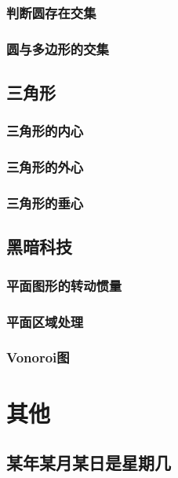 \documentclass[a4paper]{article}
\begin{document}
\subsubsection{判断圆存在交集}

\subsubsection{圆与多边形的交集}

\subsection{三角形}

\subsubsection{三角形的内心}

\subsubsection{三角形的外心}

\subsubsection{三角形的垂心}

\subsection{黑暗科技}

\subsubsection{平面图形的转动惯量}

\subsubsection{平面区域处理}

\subsubsection{Vonoroi图}

\section{其他}

\subsection{某年某月某日是星期几}
\end{document}
